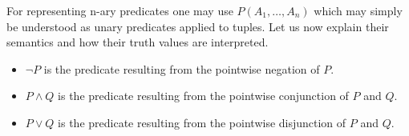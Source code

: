 \documentclass[runningheads]{llncs}
\newcommand{\SP}{\;\;\;}
\newcommand{\TAnd}{\textit{And}}
\newcommand{\TNot}{\textit{Not}}
\newcommand{\TTV}{\textit{TV}}
\newcommand{\TBTV}{\langle \TTV \rangle}
\newcommand{\prob}{\mathcal{Pr}}
\begin{document}
For representing n-ary predicates one may use $P(A_1, \dots, A_n)$
which may simply be understood as unary predicates applied to tuples.
Let us now explain their semantics and how their truth values are
interpreted.
\begin{itemize}
\item $\lnot P$ is the predicate resulting from the pointwise negation
  of $P$.
\item
  $P \land Q$ is the predicate resulting from the pointwise
  conjunction of $P$ and $Q$.
\item
  $P \lor Q$ is the predicate resulting from the pointwise disjunction
  of $P$ and $Q$.

\end{itemize}
\end{document}
